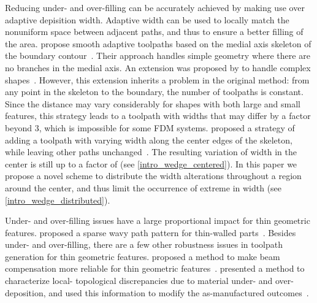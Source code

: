 Reducing under- and over-filling can be accurately achieved by making use over adaptive depisition width.
Adaptive width can be used to locally match the nonuniform space between adjacent paths, and thus to ensure a better filling of the area.
\citeauthor{kao1998optimal} propose smooth adaptive toolpaths based on the medial axis skeleton of the boundary contour~\cite{kao1998optimal}.
Their approach handles simple geometry where there are no branches in the medial axis.
An extension was proposed by \citeauthor{Ding2016a} to handle complex shapes~\cite{Ding2016a}.
However, this extension inherits a problem in the original method:
from any point in the skeleton to the boundary, the number of toolpaths is constant.
Since the distance may vary considerably for shapes with both large and small features, this strategy leads to a toolpath with widths that may differ by a factor beyond $3$, which is impossible for some FDM systems.
\citeauthor{Jin2017JMS} proposed a strategy of adding a toolpath with varying width along the center edges of the skeleton, while leaving other paths unchanged~\cite{Jin2017JMS}.
The resulting variation of width in the center is still up to a factor of  (see \cref{intro_wedge_centered}).
In this paper we propose a novel scheme to distribute the width alterations throughout a region around the center, and thus limit the occurrence of extreme  in width (see \cref{intro_wedge_distributed}).

Under- and over-filling issues have a large proportional impact for thin geometric features.
\citeauthor{Jin2017a} proposed a sparse wavy path pattern for thin-walled parts~\cite{Jin2017a}.
Besides under- and over-filling, there are a few other robustness issues in toolpath generation for thin geometric features.
\citeauthor{Moesen2011} proposed a method to make beam compensation more reliable for thin geometric features~\cite{Moesen2011}.
\citeauthor{Behandish2019a} presented a method to characterize local- topological discrepancies due to material under- and over-deposition, and used this information to modify the as-manufactured outcomes~\cite{Behandish2019a}. 



